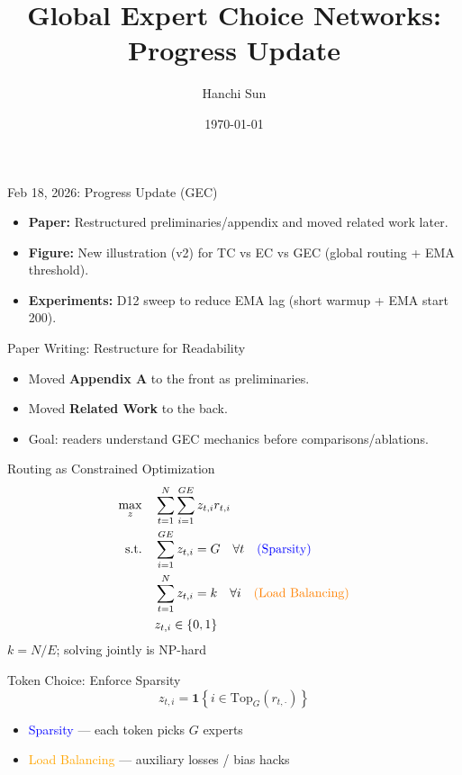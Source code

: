 \documentclass{beamer}
\title[GEC Progress]{Global Expert Choice Networks:\\Progress Update}
\author{Hanchi Sun}
\institute{Lehigh University}
\date{\today}
\begin{document}
\frame{\titlepage}



\begin{frame}{Feb 18, 2026: Progress Update (GEC)}
\begin{itemize}
    \item \textbf{Paper:} Restructured preliminaries/appendix and moved related work later.
    \item \textbf{Figure:} New illustration (v2) for TC vs EC vs GEC (global routing + EMA threshold).
    \item \textbf{Experiments:} D12 sweep to reduce EMA lag (short warmup + EMA start 200).
\end{itemize}
\end{frame}

\begin{frame}{Paper Writing: Restructure for Readability}
\begin{itemize}
    \item Moved \textbf{Appendix A} to the front as preliminaries.
    \item Moved \textbf{Related Work} to the back.
    \item Goal: readers understand GEC mechanics before comparisons/ablations.
\end{itemize}
\end{frame}

\begin{frame}{Routing as Constrained Optimization}
\begin{equation*}
\begin{aligned}
\max_{z} \quad & \sum_{t=1}^N \sum_{i=1}^{GE} z_{t,i} r_{t,i} \\
\text{s.t.} \quad & \sum_{i=1}^{GE} z_{t,i} = G \quad \forall t \quad \textcolor{blue}{(\text{Sparsity})} \\
& \sum_{t=1}^N z_{t,i} = k \quad \forall i \quad \textcolor{orange}{(\text{Load Balancing})} \\
& z_{t,i} \in \{0, 1\}
\end{aligned}
\end{equation*}
\vspace{0.5em}
\centering $k = N/E$; \quad solving jointly is NP-hard
\end{frame}

\begin{frame}{Token Choice: Enforce Sparsity}
\[
z_{t,i} = \mathbf{1}\!\left\{ i \in \mathrm{Top}_G(r_{t,\cdot}) \right\}
\]
\vspace{0.5em}
\begin{itemize}
  \item[\textcolor{blue}{\checkmark}] \textcolor{blue}{Sparsity} — each token picks $G$ experts
  \item[\textcolor{red}{$\times$}] \textcolor{orange}{Load Balancing} — auxiliary losses / bias hacks
\end{itemize}
\end{frame}
\end{document}

